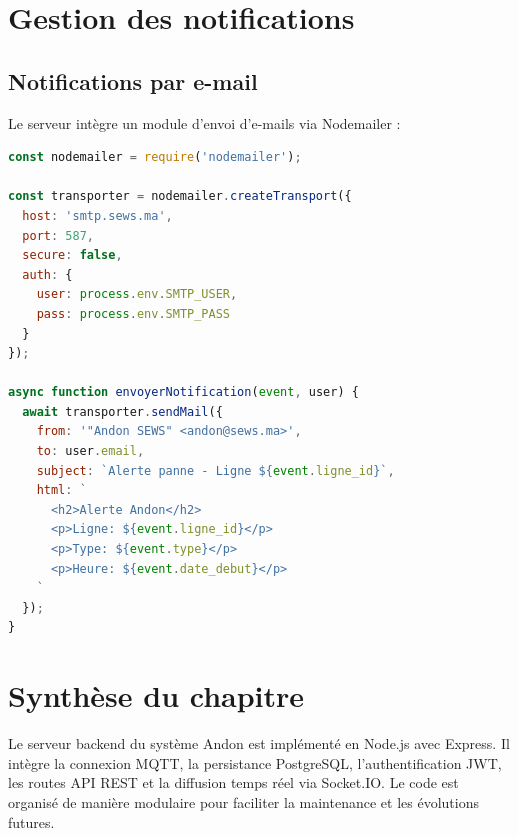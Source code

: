 \section{Gestion des notifications}

\subsection{Notifications par e-mail}

Le serveur int\`egre un module d'envoi d'e-mails via Nodemailer :

\begin{lstlisting}[language=JavaScript,caption={Envoi de notification e-mail},
label={lst:send_email}]
const nodemailer = require('nodemailer');

const transporter = nodemailer.createTransport({
  host: 'smtp.sews.ma',
  port: 587,
  secure: false,
  auth: {
    user: process.env.SMTP_USER,
    pass: process.env.SMTP_PASS
  }
});

async function envoyerNotification(event, user) {
  await transporter.sendMail({
    from: '"Andon SEWS" <andon@sews.ma>',
    to: user.email,
    subject: `Alerte panne - Ligne ${event.ligne_id}`,
    html: `
      <h2>Alerte Andon</h2>
      <p>Ligne: ${event.ligne_id}</p>
      <p>Type: ${event.type}</p>
      <p>Heure: ${event.date_debut}</p>
    `
  });
}
\end{lstlisting}

\section{Synth\`ese du chapitre}

Le serveur backend du syst\`eme Andon est impl\'ement\'e en Node.js avec Express. Il int\`egre la connexion MQTT, la persistance PostgreSQL, l'authentification JWT, les routes API REST et la diffusion temps r\'eel via Socket.IO. Le code est organis\'e de mani\`ere modulaire pour faciliter la maintenance et les \'evolutions futures.
